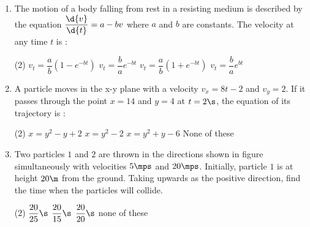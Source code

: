 \documentclass{article}
\renewcommand{\ans}{\quad}
\begin{document}
\begin{enumerate}
    \item The motion of a body falling from rest in a resisting medium is described by the equation $\dfrac{\d{v}}{\d{t}} = a -bv$ where $a$ and $b$ are constants. The velocity at any time $t$ is :
        \begin{tasks}(2)
            \task $v_t=\dfrac{a}{b}\left(1-e^{-bt}\right)$\ans
            \task $v_t=\dfrac{b}{a}e^{-bt}$
            \task $v_t=\dfrac{a}{b}\left(1+e^{-bt}\right)$
            \task $v_t=\dfrac{b}{a}e^{bt}$
        \end{tasks}
        
    \item A particle moves in the x-y plane with a velocity $v_x=8t-2$ and $v_y=2$. If it passes through the point $x=14$ and $y=4$ at $t=2\s$, the equation of its trajectory is :
        \begin{tasks}(2)
            \task $x=y^2-y+2$\ans
            \task $x=y^2-2$
            \task $x=y^2+y-6$
            \task None of these
        \end{tasks}
 
    \item Two particles $1$ and $2$ are thrown in the directions shown in figure simultaneously with velocities $5\mps$ and $20\mps$. Initially, particle $1$ is at height $20\m$ from the ground. Taking upwards as the positive direction, find the time when the particles will collide.
        \begin{center}
        \end{center}
        \begin{tasks}(2)
            \task $\dfrac{20}{25}\s$\ans
            \task $\dfrac{20}{15}\s$
            \task $\dfrac{20}{20}\s$
            \task none of these
        \end{tasks}
        

\end{enumerate}
\end{document}
